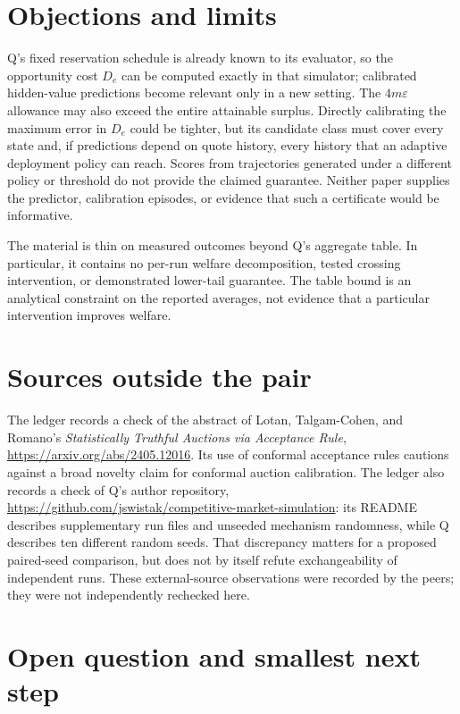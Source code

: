 \documentclass{article}
\begin{document}
\section{Objections and limits}

Q's fixed reservation schedule is already known to its evaluator, so the opportunity cost \(D_e\) can be computed exactly in that simulator; calibrated hidden-value predictions become relevant only in a new setting. The \(4m\varepsilon\) allowance may also exceed the entire attainable surplus. Directly calibrating the maximum error in \(D_e\) could be tighter, but its candidate class must cover every state and, if predictions depend on quote history, every history that an adaptive deployment policy can reach. Scores from trajectories generated under a different policy or threshold do not provide the claimed guarantee. Neither paper supplies the predictor, calibration episodes, or evidence that such a certificate would be informative. 

The material is thin on measured outcomes beyond Q's aggregate table. In particular, it contains no per-run welfare decomposition, tested crossing intervention, or demonstrated lower-tail guarantee. The table bound is an analytical constraint on the reported averages, not evidence that a particular intervention improves welfare. 

\section{Sources outside the pair}

The ledger records a check of the abstract of Lotan, Talgam-Cohen, and Romano's \emph{Statistically Truthful Auctions via Acceptance Rule}, \url{https://arxiv.org/abs/2405.12016}. Its use of conformal acceptance rules cautions against a broad novelty claim for conformal auction calibration. The ledger also records a check of Q's author repository, \url{https://github.com/jswistak/competitive-market-simulation}: its README describes supplementary run files and unseeded mechanism randomness, while Q describes ten different random seeds. That discrepancy matters for a proposed paired-seed comparison, but does not by itself refute exchangeability of independent runs. These external-source observations were recorded by the peers; they were not independently rechecked here. 

\section{Open question and smallest next step}
\end{document}
